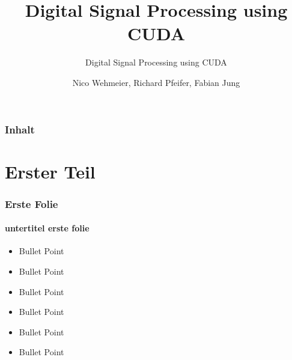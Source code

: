 \documentclass[ddcfooter]{tudbeamer}
\begin{document}
\title[Digital Signal Processing]{Digital Signal Processing using CUDA}
\subtitle{Digital Signal Processing using CUDA}
\author{Nico Wehmeier, Richard Pfeifer, Fabian Jung}
\maketitle

\begin{frame}
    \frametitle*{Inhalt}
    \tableofcontents[currentsection]
\end{frame}

\section{Erster Teil}
\begin{frame}
\frametitle{Erste Folie}
\framesubtitle{untertitel erste folie}
\begin{itemize} 
	\item{Bullet Point}
	\item{Bullet Point}
	\item{Bullet Point}
	\item{Bullet Point}
	\item{Bullet Point}
	\item{Bullet Point}
\end{itemize}
\end{frame}
\end{document}
